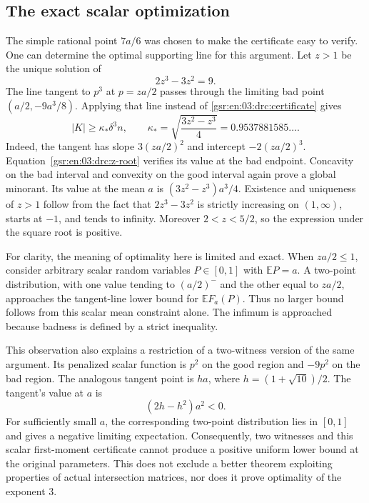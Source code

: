 \documentclass[11pt,letterpaper]{article}
\numberwithin{equation}{section}
\theoremstyle{definition}
\theoremstyle{remark}
\newcommand{\E}{\mathbb E}
\newcommand{\1}{\mathbf 1}
\newcommand{\abs}[1]{\left|#1\right|}
\begin{document}
\subsection{The exact scalar optimization}

The simple rational point $7a/6$ was chosen to make the certificate easy to
verify.  One can determine the optimal supporting line for this argument.
Let $z>1$ be the unique solution of
\begin{equation}\label{gsr:en:03:drc:z-root}
 2z^3-3z^2=9.
\end{equation}
The line tangent to $p^3$ at $p=za/2$ passes through the limiting bad point
$(a/2,-9a^3/8)$.  Applying that line instead of
\eqref{gsr:en:03:drc:certificate} gives
\begin{equation}\label{gsr:en:03:drc:optimized-constant}
 \abs K\geq\kappa_*\delta^3n,
 \qquad
 \kappa_*=\sqrt{\frac{3z^2-z^3}{4}}
          =0.9537881585\ldots.
\end{equation}
Indeed, the tangent has slope $3(za/2)^2$ and intercept $-2(za/2)^3$.
Equation~\eqref{gsr:en:03:drc:z-root} verifies its value at the bad endpoint.
Concavity on the bad interval and convexity on the good interval again
prove a global minorant.  Its value at the mean $a$ is
$(3z^2-z^3)a^3/4$.  Existence and uniqueness of $z>1$ follow from the fact
that $2z^3-3z^2$ is strictly increasing on $(1,\infty)$, starts at $-1$,
and tends to infinity. Moreover $2<z<5/2$, so the expression under
the square root is positive.

For clarity, the meaning of optimality here is limited and exact.  When
$za/2\leq1$, consider arbitrary scalar random variables $P\in[0,1]$ with
$\E P=a$.  A two-point distribution, with one value tending to $(a/2)^-$
and the other equal to $za/2$, approaches the tangent-line lower bound
for $\E F_a(P)$.  Thus no larger bound follows from this scalar mean
constraint alone.  The infimum is approached because badness is defined
by a strict inequality.

This observation also explains a restriction of a two-witness version
of the same argument.  Its penalized scalar function is $p^2$ on the good
region and $-9p^2$ on the bad region.  The analogous tangent point is
$ha$, where $h=(1+\sqrt{10})/2$.  The tangent's value at $a$ is
\[
 (2h-h^2)a^2<0.
\]
For sufficiently small $a$, the corresponding two-point distribution
lies in $[0,1]$ and gives a negative limiting expectation.  Consequently,
two witnesses and this scalar first-moment certificate cannot produce a
positive uniform lower bound at the original parameters.  This does not
exclude a better theorem exploiting properties of actual intersection
matrices, nor does it prove optimality of the exponent $3$.
\end{document}
